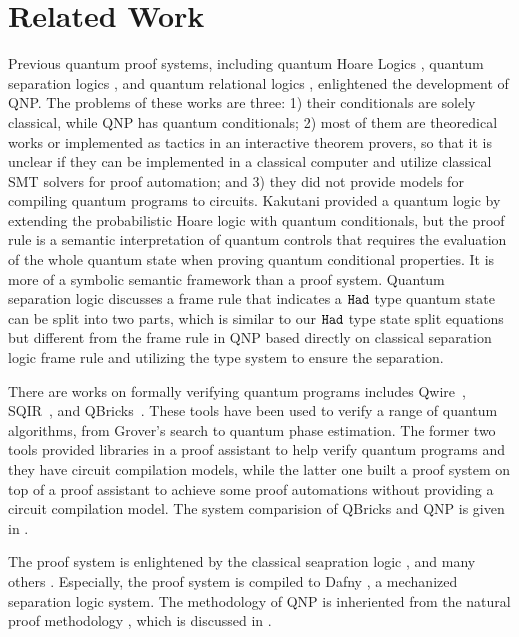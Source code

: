 \section{Related Work}
\label{sec:related}

Previous quantum proof systems, including quantum Hoare Logics \cite{qhoare,qhoreusage,10.1145/3456877,10.1007/s00165-018-0465-3},
quantum separation logics \cite{qseplocal,qsepa}, and quantum relational logics \cite{relationlogic,10.1145/3290346}, enlightened the development of QNP. The problems of these works are three: 1) their conditionals are solely classical, while QNP has quantum conditionals; 2) most of them are theoredical works or implemented as tactics in an interactive theorem provers, so that it is unclear if they can be implemented in a classical computer and utilize classical SMT solvers for proof automation; and 3) they did not provide models for compiling quantum programs to circuits. 
Kakutani \cite{10.1007/978-3-642-10622-4_7} provided a quantum logic by extending the probabilistic Hoare logic \cite{10.1007/3-540-46674-6_11} with quantum conditionals, but the proof rule is a semantic interpretation of quantum controls that requires the evaluation of the whole quantum state when proving quantum conditional properties. It is more of a symbolic semantic framework than a proof system. Quantum separation logic \cite{qseplocal} discusses a frame rule that indicates a $\texttt{Had}$ type quantum state can be split into two parts, which is similar to our $\texttt{Had}$ type state split equations but different from the frame rule in QNP based directly on classical separation logic frame rule and utilizing the \qafny type system to ensure the separation. 

There are works on formally verifying quantum programs includes Qwire~\cite{RandThesis}, SQIR~\cite{PQPC}, and QBricks~\cite{qbricks}. These tools have been used to verify a range of quantum algorithms, from Grover's search to quantum phase estimation.
The former two tools provided libraries in a proof assistant to help verify quantum programs and they have circuit compilation models, while the latter one built a proof system on top of a proof assistant to achieve some proof automations without providing a circuit compilation model. The system comparision of QBricks and QNP is given in .

The \qafny proof system is enlightened by the classical seapration logic \cite{separationlogic}, and many others \cite{10.1145/3453483.3454087,arxiv.1609.00919,10.1007/978-3-319-89960-2_13,10.1007/978-3-319-89960-2_2,nat-proof-fun}. Especially, the \qafny proof system is compiled to Dafny \cite{10.1007/978-3-642-17511-4_20}, a mechanized separation logic system. The methodology of QNP is inheriented from the natural proof methodology \cite{nat-proof-fun,nat-proof-frame,10.1145/2103621.2103673}, which is discussed in .



